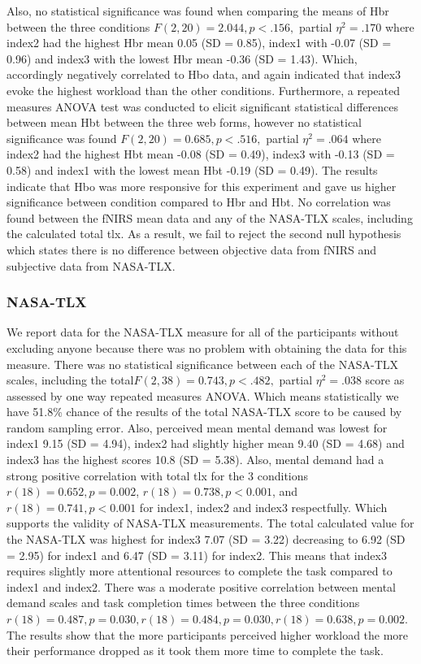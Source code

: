 \documentclass[a4paper]{report}
\begin{document}
			Also, no statistical significance was found when comparing the means of Hbr between the three conditions $F(2,20)=2.044, p<.156,$ partial $\eta^{2}=.170$ where index2 had the highest Hbr mean 0.05 (SD = 0.85), index1 with -0.07 (SD = 0.96) and index3 with the lowest Hbr mean -0.36 (SD = 1.43). Which, accordingly negatively correlated to Hbo data, and again indicated that index3 evoke the highest workload than the other conditions. Furthermore, a repeated measures ANOVA test was conducted to elicit significant statistical differences between mean Hbt between the three web forms, however no statistical significance was found $F(2,20)=0.685, p<.516,$ partial $\eta^{2}=.064$ where index2 had the highest Hbt mean -0.08 (SD = 0.49), index3 with -0.13 (SD = 0.58) and index1 with the lowest mean Hbt -0.19 (SD = 0.49). The results indicate that Hbo was more responsive for this experiment and gave us higher significance between condition compared to Hbr and Hbt. 
			No correlation was found between the fNIRS mean data and any of the NASA-TLX scales, including the calculated total tlx. As a result, we fail to reject the second null hypothesis which states there is no difference between objective data from fNIRS and subjective data from NASA-TLX.
			\subsubsection{NASA-TLX}
				We report data for the NASA-TLX measure for all of the participants without excluding anyone because there was no problem with obtaining the data for this measure.
				There was no statistical significance between each of the NASA-TLX scales, including the total$F(2,38)=0.743, p<.482,$ partial $\eta^{2}=.038$ score as assessed by one way repeated measures ANOVA. Which means statistically we have 51.8\% chance of the results of the total NASA-TLX score to be caused by random sampling error. Also, perceived mean mental demand was lowest for index1 9.15 (SD = 4.94), index2 had slightly higher mean 9.40 (SD = 4.68) and index3 has the highest scores 10.8 (SD = 5.38). Also, mental demand had a strong positive correlation with total tlx for the 3 conditions $r(18)=0.652, p=0.002$, $r(18)=0.738, p<0.001$, and $r(18)=0.741, p<0.001$ for index1, index2 and index3 respectfully. Which supports the validity of NASA-TLX measurements. The total calculated value for the NASA-TLX was highest for index3 7.07 (SD = 3.22) decreasing to 6.92 (SD = 2.95) for index1 and 6.47 (SD = 3.11) for index2. This means that index3 requires slightly more attentional resources to complete the task compared to index1 and index2.
				There was a moderate positive correlation between mental demand scales and task completion times between the three conditions  $r(18)=0.487, p=0.030,  r(18)=0.484, p=0.030,  r(18)=0.638, p=0.002$. The results show that the more participants perceived higher workload the more their performance dropped as it took them more time to complete the task.
				
\end{document}
